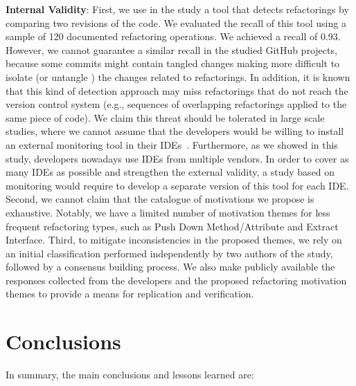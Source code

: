 \noindent \textbf{Internal Validity}: First, we use in the study a tool that detects refactorings by comparing 
two revisions of the code.
We evaluated the recall of this tool using a sample of 120 documented refactoring operations. We achieved a recall of 0.93.
However, we cannot guarantee a similar recall in the studied GitHub projects, because some commits might contain tangled changes making more difficult to isolate (or untangle \citep{Dias:2015}) the changes related to refactorings.
In addition, it is known that this kind of detection approach may miss refactorings that do not reach the 
version control system (e.g., sequences of overlapping refactorings applied to the same piece of code).
We claim this threat should be tolerated in large scale studies, where we cannot assume that the developers would be willing to install an external monitoring tool in their IDEs~\citep{negara2013}.
Furthermore, as we showed in this study, developers nowadays use IDEs from multiple vendors.
In order to cover as many IDEs as possible and strengthen the external validity,
a study based on monitoring would require to develop a separate version of this tool for each IDE.
Second, we cannot claim that the catalogue of motivations we propose is exhaustive.
Notably, we have a limited number of motivation themes 
for less frequent refactoring types, such as {\textsc Push Down Method/Attribute} and {\textsc Extract 
Interface}.
Third, to mitigate inconsistencies in the proposed themes, we rely on an initial classification
performed independently by two authors of the study, followed by a consensus building process.
We also make publicly available the responses collected from the developers and the proposed
refactoring motivation themes to provide a means for replication and verification.

\section{Conclusions}

In summary, the main conclusions and lessons learned are:


